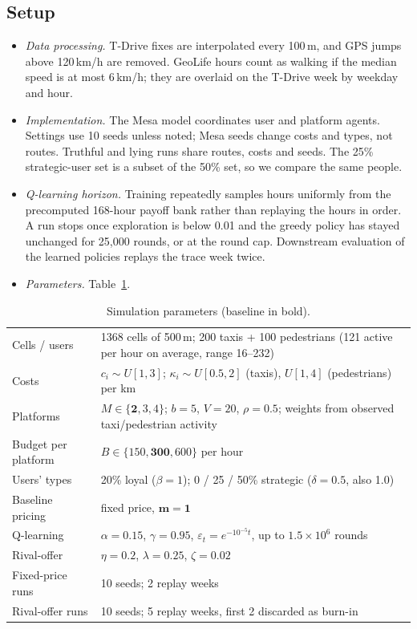 \documentclass[12pt,draftcls,onecolumn]{IEEEtran}
\begin{document}
\subsection{Setup}
\begin{itemize}
\item \emph{Data processing.} T-Drive fixes are interpolated every 100\,m, and GPS jumps above 120\,km/h are removed. GeoLife hours count as walking if the median speed is at most 6\,km/h; they are overlaid on the T-Drive week by weekday and hour.
\item \emph{Implementation.} The Mesa model coordinates user and platform agents. Settings use 10 seeds unless noted; Mesa seeds change costs and types, not routes. Truthful and lying runs share routes, costs and seeds. The 25\% strategic-user set is a subset of the 50\% set, so we compare the same people.
\item \emph{Q-learning horizon.} Training repeatedly samples hours uniformly from the precomputed 168-hour payoff bank rather than replaying the hours in order. A run stops once exploration is below 0.01 and the greedy policy has stayed unchanged for 25,000 rounds, or at the round cap. Downstream evaluation of the learned policies replays the trace week twice.
\item \emph{Parameters.} Table~\ref{tab:params}.
\end{itemize}

\begin{table}[!htbp]\centering
\caption{Simulation parameters (baseline in bold).}\label{tab:params}
\begin{tabular}{@{}ll@{}}\toprule
Cells / users & 1368 cells of 500\,m; 200 taxis + 100 pedestrians (121 active per hour on average, range 16--232)\\
Costs & $c_i\sim U[1,3]$; $\kappa_i\sim U[0.5,2]$ (taxis), $U[1,4]$ (pedestrians) per km\\
Platforms & $M\in\{\mathbf 2,3,4\}$; $b=5$, $V=20$, $\rho=0.5$; weights from observed taxi/pedestrian activity\\
Budget per platform & $B\in\{150,\mathbf{300},600\}$ per hour\\
Users' types & 20\% loyal ($\beta=1$); 0 / 25 / 50\% strategic ($\delta=0.5$, also 1.0)\\
Baseline pricing & fixed price, $\mathbf{m=1}$\\
Q-learning & $\alpha=0.15$, $\gamma=0.95$, $\varepsilon_t=e^{-10^{-5}t}$, up to $1.5\times10^6$ rounds\\
Rival-offer & $\eta=0.2$, $\lambda=0.25$, $\zeta=0.02$\\
Fixed-price runs & 10 seeds; 2 replay weeks \\
Rival-offer runs & 10 seeds; 5 replay weeks, first 2 discarded as burn-in \\
\bottomrule\end{tabular}
\end{table}
\end{document}
